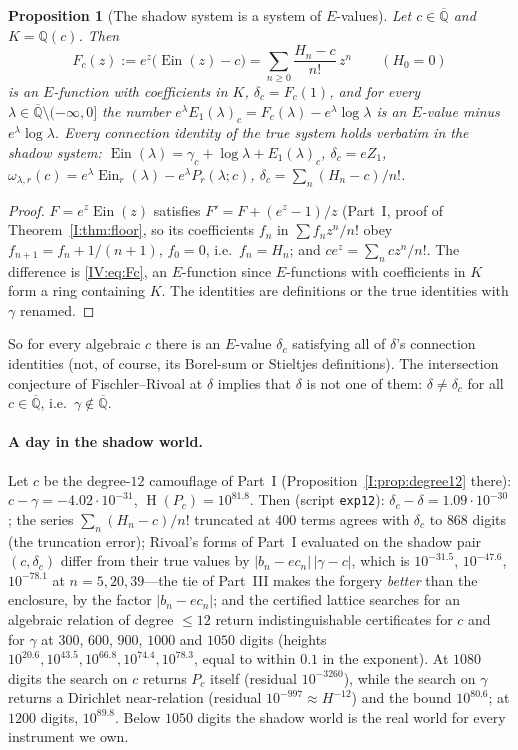 \documentclass[11pt,a4paper]{article}
\newcommand{\Q}{\mathbb Q}
\newcommand{\Qbar}{\overline{\mathbb Q}}
\newcommand{\Ein}{\operatorname{Ein}}
\DeclareMathOperator{\Ht}{H}
\newtheorem{proposition}[theorem]{Proposition}
\theoremstyle{definition}
\theoremstyle{remark}
\numberwithin{equation}{section}
\begin{document}
\begin{proposition}[The shadow system is a system of $E$-values]\label{IV:prop:shadowE}
Let $c\in\Qbar$ and $K=\Q(c)$. Then
\begin{equation}\label{IV:eq:Fc}
 F_c(z):=e^z\bigl(\Ein(z)-c\bigr)=\sum_{n\ge0}\frac{H_n-c}{n!}\,z^n\qquad(H_0=0)
\end{equation}
is an $E$-function with coefficients in $K$, $\delta_c=F_c(1)$, and for every
$\lambda\in\Qbar\setminus(-\infty,0]$ the number $e^\lambda E_1(\lambda)_c=F_c(\lambda)-e^\lambda\log\lambda$
is an $E$-value minus $e^\lambda\log\lambda$. Every connection identity of the true system
holds verbatim in the shadow system: $\Ein(\lambda)=\gamma_c+\log\lambda+E_1(\lambda)_c$,
$\delta_c=eZ_1$, $\omega_{\lambda,r}(c)=e^\lambda\Ein_r(\lambda)-e^\lambda P_r(\lambda;c)$,
$\delta_c=\sum_n(H_n-c)/n!$.
\end{proposition}
\begin{proof}
$F=e^z\Ein(z)$ satisfies $F'=F+(e^z-1)/z$ (Part~I, proof of Theorem~\ref{I:thm:floor}, so its
coefficients $f_n$ in $\sum f_nz^n/n!$ obey $f_{n+1}=f_n+1/(n+1)$, $f_0=0$, i.e.\
$f_n=H_n$; and $ce^z=\sum_ncz^n/n!$. The difference is \eqref{IV:eq:Fc}, an $E$-function
since $E$-functions with coefficients in $K$ form a ring containing $K$. The identities are definitions or the true identities with
$\gamma$ renamed.
\end{proof}

So for every algebraic $c$ there is an $E$-value $\delta_c$ satisfying all of $\delta$'s
connection identities (not, of course, its Borel-sum or Stieltjes definitions). The
intersection conjecture of Fischler--Rivoal at $\delta$ implies that $\delta$ is not one of
them: $\delta\ne\delta_c$ for all $c\in\Qbar$, i.e.\ $\gamma\notin\Qbar$.

\paragraph{A day in the shadow world.} Let $c$ be the degree-$12$ camouflage of Part~I
(Proposition~\ref{I:prop:degree12} there): $c-\gamma=-4.02\cdot10^{-31}$, $\Ht(P_c)=10^{81.8}$. Then
(script \texttt{exp12}): $\delta_c-\delta=1.09\cdot10^{-30}$; the series
$\sum_n(H_n-c)/n!$ truncated at $400$ terms agrees with $\delta_c$ to $868$ digits (the
truncation error); Rivoal's forms of Part~I
evaluated on the shadow pair $(c,\delta_c)$ differ from their true values by
$|b_n-ec_n|\,|\gamma-c|$, which is $10^{-31.5}$, $10^{-47.6}$, $10^{-78.1}$ at
$n=5,20,39$---the tie of Part~III makes the forgery \emph{better} than the enclosure, by
the factor $|b_n-ec_n|$; and the certified lattice searches for an algebraic relation of
degree $\le12$ return indistinguishable certificates for $c$ and for $\gamma$ at $300$,
$600$, $900$, $1000$ and $1050$ digits (heights $10^{20.6},10^{43.5},10^{66.8},10^{74.4},10^{78.3}$,
equal to within $0.1$ in the exponent).
At $1080$ digits the search on $c$ returns $P_c$ itself (residual $10^{-3260}$), while the
search on $\gamma$ returns a Dirichlet near-relation (residual $10^{-997}\approx H^{-12}$)
and the bound $10^{80.6}$; at $1200$ digits, $10^{89.8}$. Below $1050$ digits the shadow
world is the real world for every instrument we own.
\end{document}
